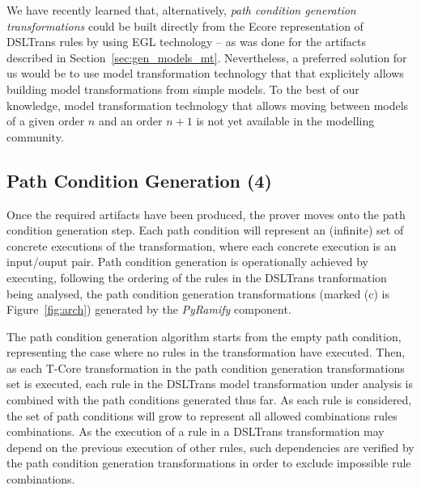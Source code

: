We have recently learned that, alternatively, \emph{path condition generation
transformations} could be built directly from the Ecore representation of
DSLTrans rules by using EGL technology -- as was done for the artifacts
described in Section~\ref{sec:gen_models_mt}. Nevertheless, a preferred solution for us would
be to use model transformation technology that that explicitely allows
building model transformations from simple models. To the best of our knowledge,
model transformation technology that allows moving between models of a given
order $n$ and an order $n+1$ is not yet available in the modelling community.

\subsection{Path Condition Generation (4)}
\label{sec:path_cond_gen}

Once the required artifacts have been produced, the prover moves onto the path
condition generation step. Each path condition will represent an (infinite) set
of concrete executions of the transformation, where each concrete execution is an
input/ouput pair. Path condition generation is operationally achieved by
executing, following the ordering of the rules in the DSLTrans
tranformation being analysed, the path condition generation transformations
(marked (c) is Figure~\ref{fig:arch}) generated by the \emph{PyRamify}
component.

The path condition generation algorithm starts from the empty path condition,
representing the case where no rules in the transformation have executed. Then,
as each T-Core transformation in the path condition generation transformations
set is executed, each rule in the DSLTrans model transformation under analysis
is combined with the path conditions generated thus far. As each rule is
considered, the set of path conditions will grow to represent all allowed
combinations rules combinations. As the execution of a rule in a DSLTrans
transformation may depend on the previous execution of other rules, such
dependencies are verified by the path condition generation
transformations in order to exclude impossible rule combinations.


